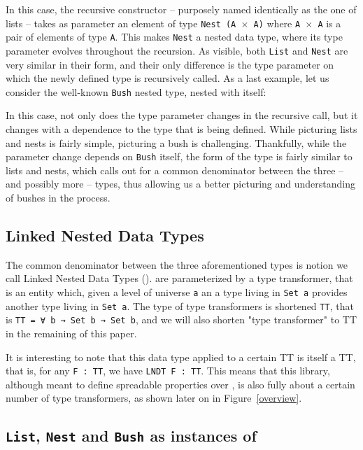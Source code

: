 \documentclass[a4paper,UKenglish,cleveref, autoref, thm-restate]{lipics}
\begin{document}
\exampleNest

In this case, the recursive constructor -- purposely named identically as the one of lists -- takes as parameter an element of type \texttt{Nest (A $\times$ A)} where \texttt{A $\times$ A} is a pair of elements of type \texttt{A}. This makes \texttt{Nest} a nested data type, where its type parameter evolves throughout the recursion. As visible, both \texttt{List} and \texttt{Nest} are very similar in their form, and their only difference is the type parameter on which the newly defined type is recursively called. As a last example, let us consider the well-known \texttt{Bush} nested type, nested with itself:

\exampleBush

In this case, not only does the type parameter changes in the recursive call, but it changes with a dependence to the type that is being defined. While picturing lists and nests is fairly simple, picturing a bush is challenging. Thankfully, while the parameter change depends on \texttt{Bush} itself, the form of the type is fairly similar to lists and nests, which calls out for a common denominator between the three -- and possibly more -- types, thus allowing us a better picturing and understanding of bushes in the process.

\subsection{Linked Nested Data Types}\label{ssec:lndts}

The common denominator between the three aforementioned types is notion we call Linked Nested Data Types (\linears). \linears are parameterized by a type transformer, that is an entity which, given a level of universe \texttt{a} an a type living in \texttt{Set a} provides another type living in \texttt{Set a}. The type of type transformers is shortened \texttt{TT}, that is \texttt{TT = ∀ {b} → Set b → Set b}, and we will also shorten "type transformer" to TT in the remaining of this paper.

\lndt

It is interesting to note that this data type applied to a certain TT is itself a TT, that is, for any \texttt{F : TT}, we have \texttt{LNDT F : TT}. This means that this library, although meant to define spreadable properties over \linears, is also fully about a certain number of type transformers, as shown later on in Figure~\ref{overview}.

\subsection{\texttt{List}, \texttt{Nest} and \texttt{Bush} as instances of \linear}\label{ssec:lndtlnb}
\end{document}
